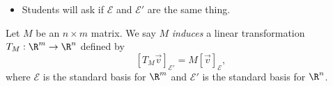 \documentclass{problemset}
\begin{document}
	\begin{annotation}
		\begin{notes}
			\begin{itemize}
				\item Students will ask if $\mathcal E$ and $\mathcal E'$ are the same thing.
			\end{itemize}
		\end{notes}
	\end{annotation}
	\begin{definition}
		Let $M$ be an $n\times m$ matrix. We say $M$ \emph{induces}
		a linear transformation $T_M:\R^m\to\R^n$ defined by
		\[
			[T_M\vec v]_{\mathcal E'} = M[\vec v]_{\mathcal E},
		\]
		where $\mathcal E$ is the standard basis for $\R^m$ and $\mathcal E'$
		is the standard basis for $\R^n$.
	\end{definition}
	
\end{document}
